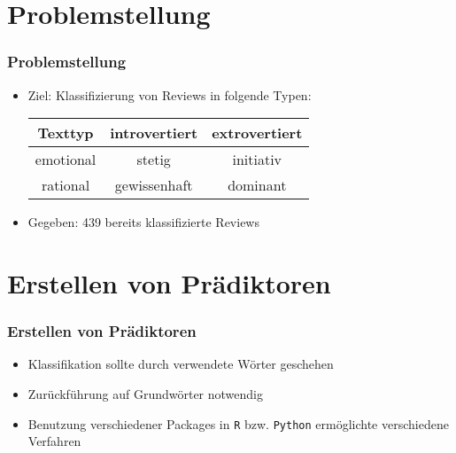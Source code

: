 


%


\section{Problemstellung}
\begin{frame}
\frametitle{Problemstellung}
\begin{itemize}\setlength\parskip{12pt}
\item Ziel: Klassifizierung von Reviews in folgende Typen:
\begin{center}
\begin{tabular}{c|c|c}
Texttyp & introvertiert & extrovertiert \\
\hline 
emotional & stetig & initiativ\\
rational & gewissenhaft & dominant
\end{tabular}
\end{center}
\item Gegeben: 439 bereits klassifizierte Reviews
\end{itemize}
\end{frame}

\section{Erstellen von Prädiktoren}
\begin{frame}
\frametitle{Erstellen von Prädiktoren}
\begin{itemize}\itemsep12pt
\item Klassifikation sollte durch verwendete Wörter geschehen
\item Zurückführung auf Grundwörter notwendig
\item Benutzung verschiedener Packages in \texttt{R} bzw. \texttt{Python} ermöglichte verschiedene Verfahren
\end{itemize}
\end{frame}

